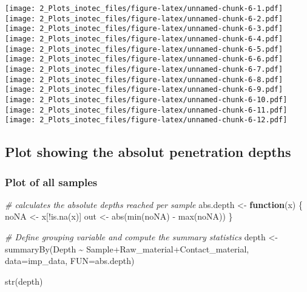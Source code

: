 \documentclass[
]{article}
\newenvironment{Shaded}{\begin{snugshade}}{\end{snugshade}}
\newcommand{\AttributeTok}[1]{\textcolor[rgb]{0.77,0.63,0.00}{#1}}
\newcommand{\CommentTok}[1]{\textcolor[rgb]{0.56,0.35,0.01}{\textit{#1}}}
\newcommand{\ControlFlowTok}[1]{\textcolor[rgb]{0.13,0.29,0.53}{\textbf{#1}}}
\newcommand{\FunctionTok}[1]{\textcolor[rgb]{0.00,0.00,0.00}{#1}}
\newcommand{\NormalTok}[1]{#1}
\newcommand{\OtherTok}[1]{\textcolor[rgb]{0.56,0.35,0.01}{#1}}
\newcommand{\SpecialCharTok}[1]{\textcolor[rgb]{0.00,0.00,0.00}{#1}}
\begin{document}
\texttt{[image: 2\_Plots\_inotec\_files/figure-latex/unnamed-chunk-6-1.pdf]}
\texttt{[image: 2\_Plots\_inotec\_files/figure-latex/unnamed-chunk-6-2.pdf]}
\texttt{[image: 2\_Plots\_inotec\_files/figure-latex/unnamed-chunk-6-3.pdf]}
\texttt{[image: 2\_Plots\_inotec\_files/figure-latex/unnamed-chunk-6-4.pdf]}
\texttt{[image: 2\_Plots\_inotec\_files/figure-latex/unnamed-chunk-6-5.pdf]}
\texttt{[image: 2\_Plots\_inotec\_files/figure-latex/unnamed-chunk-6-6.pdf]}
\texttt{[image: 2\_Plots\_inotec\_files/figure-latex/unnamed-chunk-6-7.pdf]}
\texttt{[image: 2\_Plots\_inotec\_files/figure-latex/unnamed-chunk-6-8.pdf]}
\texttt{[image: 2\_Plots\_inotec\_files/figure-latex/unnamed-chunk-6-9.pdf]}
\texttt{[image: 2\_Plots\_inotec\_files/figure-latex/unnamed-chunk-6-10.pdf]}
\texttt{[image: 2\_Plots\_inotec\_files/figure-latex/unnamed-chunk-6-11.pdf]}
\texttt{[image: 2\_Plots\_inotec\_files/figure-latex/unnamed-chunk-6-12.pdf]}

\hypertarget{plot-showing-the-absolut-penetration-depths}{%
\subsection{Plot showing the absolut penetration
depths}\label{plot-showing-the-absolut-penetration-depths}}

\hypertarget{plot-of-all-samples}{%
\subsubsection{Plot of all samples}\label{plot-of-all-samples}}

\begin{Shaded}
\begin{Highlighting}[]
\CommentTok{\# calculates the absolute depths reached per sample}
\NormalTok{abs.depth }\OtherTok{\textless{}{-}} \ControlFlowTok{function}\NormalTok{(x) \{}
\NormalTok{  noNA }\OtherTok{\textless{}{-}}\NormalTok{ x[}\SpecialCharTok{!}\FunctionTok{is.na}\NormalTok{(x)]}
\NormalTok{  out }\OtherTok{\textless{}{-}} \FunctionTok{abs}\NormalTok{(}\FunctionTok{min}\NormalTok{(noNA) }\SpecialCharTok{{-}} \FunctionTok{max}\NormalTok{(noNA))}
\NormalTok{\}}

\CommentTok{\# Define grouping variable and compute the summary statistics }
\NormalTok{depth }\OtherTok{\textless{}{-}} \FunctionTok{summaryBy}\NormalTok{(Depth }\SpecialCharTok{\textasciitilde{}}\NormalTok{ Sample}\SpecialCharTok{+}\NormalTok{Raw\_material}\SpecialCharTok{+}\NormalTok{Contact\_material, }
                  \AttributeTok{data=}\NormalTok{imp\_data, }
                  \AttributeTok{FUN=}\NormalTok{abs.depth)}

\FunctionTok{str}\NormalTok{(depth)}
\end{Highlighting}
\end{Shaded}
\end{document}
